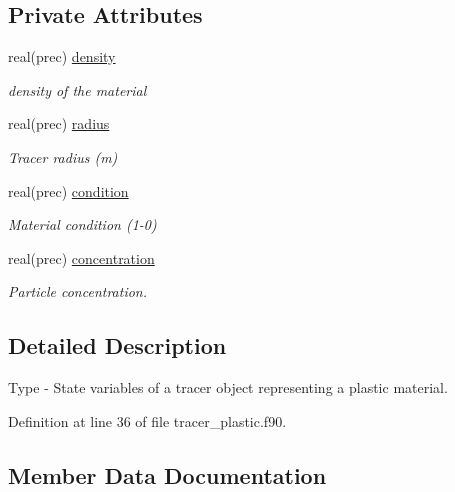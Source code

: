 \subsection*{Private Attributes}
\begin{DoxyCompactItemize}
\item 
real(prec) \mbox{\hyperlink{structtracer__plastic__mod_1_1plastic__state__class_a3a8175a6595dfe7d585284fe060b9735}{density}}
\begin{DoxyCompactList}\small\item\em density of the material \end{DoxyCompactList}\item 
real(prec) \mbox{\hyperlink{structtracer__plastic__mod_1_1plastic__state__class_a597b5dbe3ba58a0d58d7897fbadaea34}{radius}}
\begin{DoxyCompactList}\small\item\em Tracer radius (m) \end{DoxyCompactList}\item 
real(prec) \mbox{\hyperlink{structtracer__plastic__mod_1_1plastic__state__class_afd1aa02ed79b13a44724f5bd550debb7}{condition}}
\begin{DoxyCompactList}\small\item\em Material condition (1-\/0) \end{DoxyCompactList}\item 
real(prec) \mbox{\hyperlink{structtracer__plastic__mod_1_1plastic__state__class_a5eb0b91416c97191e62c5710beba6f8d}{concentration}}
\begin{DoxyCompactList}\small\item\em Particle concentration. \end{DoxyCompactList}\end{DoxyCompactItemize}


\subsection{Detailed Description}
Type -\/ State variables of a tracer object representing a plastic material. 

Definition at line 36 of file tracer\+\_\+plastic.\+f90.



\subsection{Member Data Documentation}
\mbox{\label{structtracer__plastic__mod_1_1plastic__state__class_a5eb0b91416c97191e62c5710beba6f8d}} 
